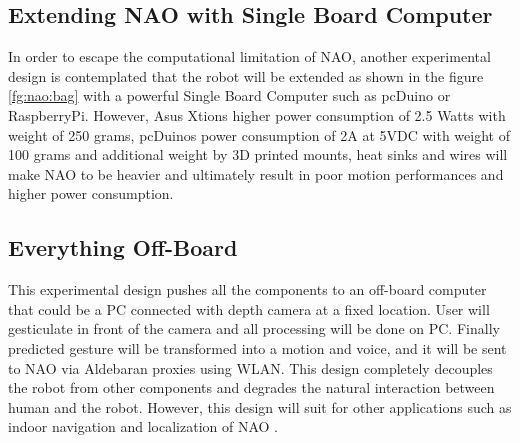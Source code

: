 \subsection{Extending NAO with Single Board Computer} In order to escape the computational limitation of NAO, another experimental design is contemplated that the robot will be extended as shown in the figure \ref{fg:nao:bag} with a powerful Single Board Computer such as pcDuino or RaspberryPi. However, Asus Xtions higher power consumption of 2.5 Watts with weight of 250 grams, pcDuinos power consumption of 2A at 5VDC with weight of 100 grams and additional weight by 3D printed mounts, heat sinks and wires will make NAO to be heavier and ultimately result in poor motion performances and higher power consumption. 



\subsection{Everything Off-Board} This experimental design pushes all the components to an off-board computer that could be a PC connected with depth camera at a fixed location. User will gesticulate in front of the camera and all processing will be done on PC. Finally predicted gesture will be transformed into a motion and voice, and it will be sent to NAO via Aldebaran proxies using WLAN. This design completely decouples the robot from other components and degrades the natural interaction between human and the robot. However, this design will suit for other applications such as indoor navigation and localization of NAO \cite{20}.

